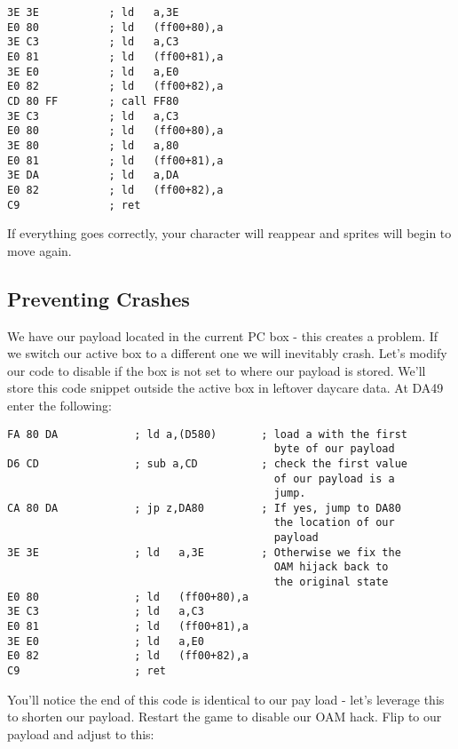 \documentclass[../main.tex]{subfiles}
\begin{document}
    \begin{verbatim}
3E 3E           ; ld   a,3E
E0 80           ; ld   (ff00+80),a
3E C3           ; ld   a,C3
E0 81           ; ld   (ff00+81),a
3E E0           ; ld   a,E0
E0 82           ; ld   (ff00+82),a
CD 80 FF        ; call FF80
3E C3           ; ld   a,C3
E0 80           ; ld   (ff00+80),a
3E 80           ; ld   a,80
E0 81           ; ld   (ff00+81),a
3E DA           ; ld   a,DA
E0 82           ; ld   (ff00+82),a
C9              ; ret  
    \end{verbatim}

    If everything goes correctly, your character will reappear and sprites will begin to move again.

    \subsection{Preventing Crashes}
    We have our payload located in the current PC box - this creates a problem.  If we switch our active box to a different one we will inevitably crash.  Let's modify our code to disable if the box is not set to where our payload is stored.  We'll store this code snippet outside the active box in leftover daycare data.  At DA49 enter the following:

    \begin{verbatim}
FA 80 DA            ; ld a,(D580)       ; load a with the first
                                          byte of our payload
D6 CD               ; sub a,CD          ; check the first value
                                          of our payload is a
                                          jump.
CA 80 DA            ; jp z,DA80         ; If yes, jump to DA80
                                          the location of our
                                          payload
3E 3E               ; ld   a,3E         ; Otherwise we fix the
                                          OAM hijack back to
                                          the original state
E0 80               ; ld   (ff00+80),a
3E C3               ; ld   a,C3
E0 81               ; ld   (ff00+81),a
3E E0               ; ld   a,E0
E0 82               ; ld   (ff00+82),a
C9                  ; ret
    \end{verbatim}

    You'll notice the end of this code is identical to our pay load - let's leverage this to shorten our payload.  Restart the game to disable our OAM hack.  Flip to our payload and adjust to this:
\end{document}

